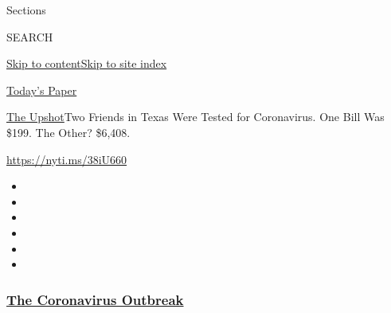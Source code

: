 Sections

SEARCH

\protect\hyperlink{site-content}{Skip to
content}\protect\hyperlink{site-index}{Skip to site index}

\href{https://myaccount.nytimes3xbfgragh.onion/auth/login?response_type=cookie\&client_id=vi}{}

\href{https://www.nytimes3xbfgragh.onion/section/todayspaper}{Today's
Paper}

\href{/section/upshot}{The Upshot}\textbar{}Two Friends in Texas Were
Tested for Coronavirus. One Bill Was \$199. The Other? \$6,408.

\url{https://nyti.ms/38iU660}

\begin{itemize}
\item
\item
\item
\item
\item
\item
\end{itemize}

\hypertarget{the-coronavirus-outbreak}{%
\subsubsection{\texorpdfstring{\href{https://www.nytimes3xbfgragh.onion/news-event/coronavirus?name=styln-coronavirus-national\&region=TOP_BANNER\&block=storyline_menu_recirc\&action=click\&pgtype=Article\&impression_id=c8706080-f4b4-11ea-819f-ab65e79fd32a\&variant=undefined}{The
Coronavirus
Outbreak}}{The Coronavirus Outbreak}}\label{the-coronavirus-outbreak}}


